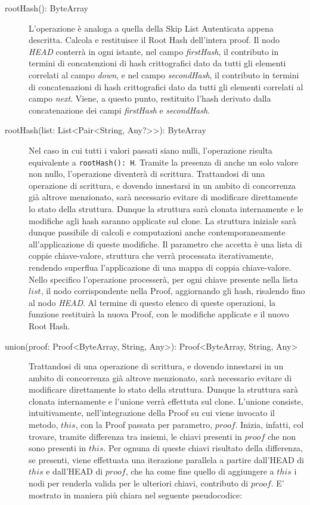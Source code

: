 		\begin{description}
			\item[rootHash(): ByteArray] L'operazione è analoga a quella della Skip List Autenticata appena descritta. Calcola e restituisce il Root Hash dell'intera proof. Il nodo \textit{HEAD} conterrà in ogni istante, nel campo \textit{firstHash}, il contributo in termini di concatenzioni di hash crittografici dato da tutti gli elementi correlati al campo \textit{down}, e nel campo \textit{secondHash}, il contributo in termini di concatenazioni di hash crittografici dato da tutti gli elementi correlati al campo \textit{next}. Viene, a questo punto, restituito l'hash derivato dalla concatenazione dei campi \textit{firstHash} e \textit{secondHash}.
			
			\item[rootHash(list: List<Pair<String, Any?>{}>): ByteArray] Nel caso in cui tutti i valori passati siano nulli, l'operazione risulta equivalente a \verb|rootHash(): H|. Tramite la presenza di anche un solo valore non nullo, l'operazione diventerà di scrittura. Trattandosi di una operazione di scrittura, e dovendo innestarsi in un ambito di concorrenza già altrove menzionato, sarà necessario evitare di modificare direttamente lo stato della struttura. Dunque la struttura sarà clonata internamente e le modifiche agli hash saranno applicate sul clone. La struttura iniziale sarà dunque passibile di calcoli e computazioni anche contemporaneamente all'applicazione di queste modifiche. Il parametro che accetta è una lista di coppie chiave-valore, struttura che verrà processata iterativamente, rendendo superflua l'applicazione di una mappa di coppia chiave-valore. Nello specifico l'operazione processerà, per ogni chiave presente nella lista $ list $, il nodo corrispondente nella Proof, aggiornando gli hash, risalendo fino al nodo \textit{HEAD}. Al termine di questo elenco di queste operazioni, la funzione restituirà la nuova Proof, con le modifiche applicate e il nuovo Root Hash.
			
			\item[union(proof: Proof<ByteArray, String, Any>): Proof<ByteArray, String, Any>] Trattandosi di una operazione di scrittura, e dovendo innestarsi in un ambito di concorrenza già altrove menzionato, sarà necessario evitare di modificare direttamente lo stato della struttura. Dunque la struttura sarà clonata internamente e l'unione verrà effettuta sul clone. L'unione consiste, intuitivamente, nell'integrazione della Proof su cui viene invocato il metodo, $ this $, con la Proof passata per parametro, $ proof $. Inizia, infatti, col trovare, tramite differenza tra insiemi, le chiavi presenti in $ proof $ che non sono presenti in $ this $. Per ognuna di queste chiavi risultato della differenza, se presenti, viene effettuata una iterazione parallela a partire dall'HEAD di $ this $ e dall'HEAD di $ proof $, che ha come fine quello di aggiungere a $ this $ i nodi per renderla valida per le ulteriori chiavi, contributo di $ proof $. E' mostrato in maniera più chiara nel seguente pseudocodice:
			

\end{description}
